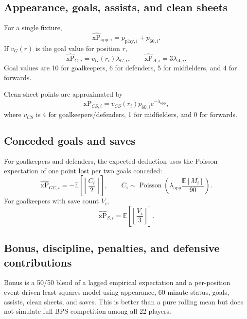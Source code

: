\documentclass[11pt,a4paper]{article}
\newcommand{\xp}{\widehat{\mathrm{xP}}}
\newcommand{\E}{\mathbb{E}}
\begin{document}
\subsection{Appearance, goals, assists, and clean sheets}

For a single fixture,
\begin{equation}
  \xp_{\text{app},i}=p_{\text{play},i}+p_{60,i}.
\end{equation}
If $v_G(r)$ is the goal value for position $r$,
\begin{equation}
  \xp_{G,i}=v_G(r_i)\lambda_{G,i},\qquad
  \xp_{A,i}=3\lambda_{A,i}.
\end{equation}
Goal values are 10 for goalkeepers, 6 for defenders, 5 for midfielders, and 4 for forwards.

Clean-sheet points are approximated by
\begin{equation}
  \xp_{CS,i}=v_{CS}(r_i)p_{60,i}e^{-\lambda_{\text{opp}}},
\end{equation}
where $v_{CS}$ is 4 for goalkeepers/defenders, 1 for midfielders, and 0 for forwards.

\subsection{Conceded goals and saves}

For goalkeepers and defenders, the expected deduction uses the Poisson expectation of one point lost per two goals conceded:
\begin{equation}
  \xp_{GC,i}=-\E\!\left[\left\lfloor\frac{C_i}{2}\right\rfloor\right],
  \qquad C_i\sim\operatorname{Poisson}\!\left(\lambda_{\text{opp}}\frac{\E[M_i]}{90}\right).
\end{equation}
For goalkeepers with save count $V_i$,
\begin{equation}
  \xp_{S,i}=\E\!\left[\left\lfloor\frac{V_i}{3}\right\rfloor\right].
\end{equation}

\subsection{Bonus, discipline, penalties, and defensive contributions}

Bonus is a 50/50 blend of a lagged empirical expectation and a per-position event-driven least-squares model using appearance, 60-minute status, goals, assists, clean sheets, and saves. This is better than a pure rolling mean but does not simulate full BPS competition among all 22 players.
\end{document}
